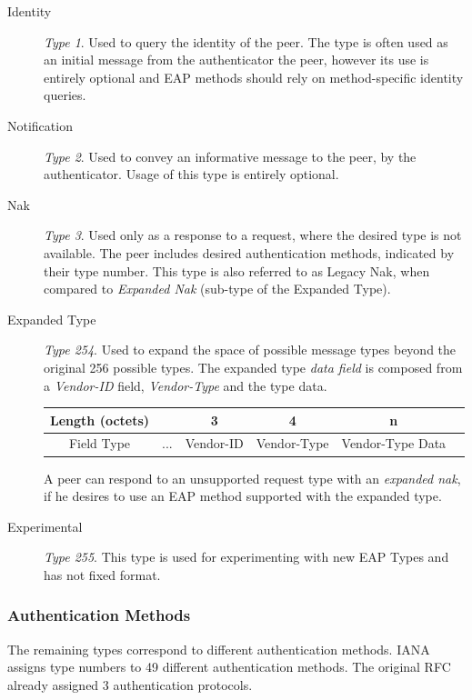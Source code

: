 \begin{description}
	\item[Identity] \textit{Type 1}. Used to query the identity of the peer. The type is often used as an initial message from the authenticator the peer, however its use is entirely optional and EAP methods should rely on method-specific identity queries.
	
	\item[Notification]\textit{Type 2}. Used to convey an informative message to the peer, by the authenticator. Usage of this type is entirely optional.
	\item[Nak]\textit{Type 3}. Used only as a response to a request, where the desired type is not available.
	The peer includes desired authentication methods, indicated by their type number.
	This type is also referred to as Legacy Nak, when compared to \textit{Expanded Nak} (sub-type of the Expanded Type).
	\item[Expanded Type] \textit{Type 254}. 
	Used to expand the space of possible message types beyond the original 256 possible types.
	The expanded type \textit{data field} is composed from a \textit{Vendor-ID} field, \textit{Vendor-Type} and the type data.
	\bigskip
	\begin{center}
		\begin{tabular}{|c|c|c|c|c|c|}
		\cline{2-5}
		\hline
		Length (octets) & & 3 & 4 & n\\
		\hline
		Field Type & ... & Vendor-ID & Vendor-Type & Vendor-Type Data\\
		\hline
		\end{tabular}
	\end{center}
	\bigskip
	A peer can respond to an unsupported request type with an \textit{expanded nak}, if he desires to use an EAP method supported with the expanded type.
	\item[Experimental] \textit{Type 255}. This type is used for experimenting with new EAP Types and has not fixed format.
\end{description}

\subsubsection{Authentication Methods}
The remaining types correspond to different authentication methods.
IANA \cite{joseph2004eap} assigns type numbers to 49 different authentication methods.
The original RFC \cite{aboba2004extensible} already assigned 3 authentication protocols.

